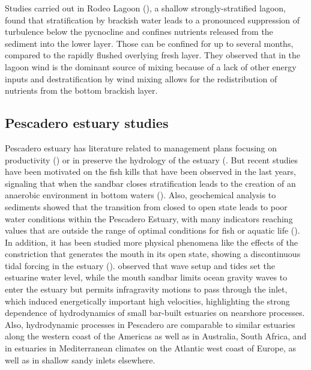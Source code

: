 \documentclass[tesis.tex]{subfiles}
\begin{document}
Studies carried out in Rodeo Lagoon (\cite{Cousins2010}), a shallow strongly-stratified lagoon, found that stratification by brackish water leads to a pronounced suppression of turbulence below the pycnocline and confines nutrients released from the sediment into the lower layer. Those can be confined for up to several months, compared to the rapidly flushed overlying fresh layer. They observed that in the lagoon wind is the dominant source of mixing because of a lack of other energy inputs and destratification by wind mixing allows for the redistribution of nutrients from the bottom brackish layer.\\

\subsection{Pescadero estuary studies}

Pescadero estuary has literature related to management plans focusing on productivity (\cite{curry1985pescadero}) or in preserve the hydrology of the estuary (\cite{williams1990pescadero}. But recent studies have been motivated on the fish kills that have been observed in the last years, signaling that when the sandbar closes stratification leads to the creation of an anaerobic environment in bottom waters (\cite{sloan2006ecological}). Also, geochemical analysis to sediments showed that the transition from closed to open state leads to poor water conditions within the Pescadero Estuary, with many indicators reaching values that are outside the range of optimal conditions for fish or aquatic life (\cite{richards2018}). \\

In addition, it has been studied more physical phenomena like the effects of the constriction that generates the mouth in its open state, showing a discontinuous tidal forcing in the estuary (\cite{williams2016}). \citeauthor{williams2016} observed that wave setup and tides set the estuarine water level, while the mouth sandbar limits ocean gravity waves to enter the estuary but permits infragravity motions to pass through the inlet, which induced energetically important high velocities, highlighting the strong dependence of hydrodynamics of small bar-built estuaries on nearshore processes. Also, hydrodynamic processes in Pescadero are comparable to similar estuaries along the western coast of the Americas as well as in Australia, South Africa, and in estuaries in Mediterranean climates on the Atlantic west coast of Europe, as well as in shallow sandy inlets elsewhere.\\
\end{document}
